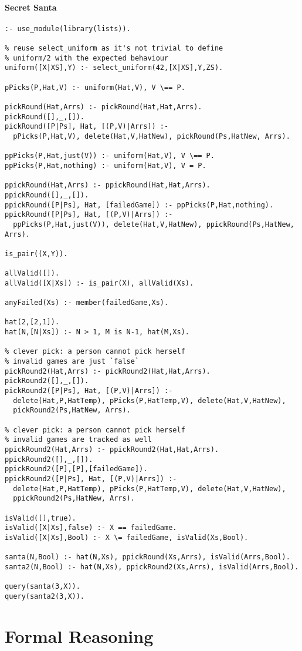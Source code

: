 \paragraph{Secret Santa}
\begin{verbatim}
:- use_module(library(lists)).

% reuse select_uniform as it's not trivial to define
% uniform/2 with the expected behaviour
uniform([X|XS],Y) :- select_uniform(42,[X|XS],Y,ZS).

pPicks(P,Hat,V) :- uniform(Hat,V), V \== P.

pickRound(Hat,Arrs) :- pickRound(Hat,Hat,Arrs).
pickRound([],_,[]).
pickRound([P|Ps], Hat, [(P,V)|Arrs]) :-
  pPicks(P,Hat,V), delete(Hat,V,HatNew), pickRound(Ps,HatNew, Arrs).

ppPicks(P,Hat,just(V)) :- uniform(Hat,V), V \== P.
ppPicks(P,Hat,nothing) :- uniform(Hat,V), V = P.

ppickRound(Hat,Arrs) :- ppickRound(Hat,Hat,Arrs).
ppickRound([],_,[]).
ppickRound([P|Ps], Hat, [failedGame]) :- ppPicks(P,Hat,nothing).
ppickRound([P|Ps], Hat, [(P,V)|Arrs]) :-
  ppPicks(P,Hat,just(V)), delete(Hat,V,HatNew), ppickRound(Ps,HatNew, Arrs).

is_pair((X,Y)).

allValid([]).
allValid([X|Xs]) :- is_pair(X), allValid(Xs).

anyFailed(Xs) :- member(failedGame,Xs).

hat(2,[2,1]).
hat(N,[N|Xs]) :- N > 1, M is N-1, hat(M,Xs).

% clever pick: a person cannot pick herself
% invalid games are just `false`
pickRound2(Hat,Arrs) :- pickRound2(Hat,Hat,Arrs).
pickRound2([],_,[]).
pickRound2([P|Ps], Hat, [(P,V)|Arrs]) :-
  delete(Hat,P,HatTemp), pPicks(P,HatTemp,V), delete(Hat,V,HatNew),
  pickRound2(Ps,HatNew, Arrs).

% clever pick: a person cannot pick herself
% invalid games are tracked as well
ppickRound2(Hat,Arrs) :- ppickRound2(Hat,Hat,Arrs).
ppickRound2([],_,[]).
ppickRound2([P],[P],[failedGame]).
ppickRound2([P|Ps], Hat, [(P,V)|Arrs]) :-
  delete(Hat,P,HatTemp), pPicks(P,HatTemp,V), delete(Hat,V,HatNew),
  ppickRound2(Ps,HatNew, Arrs).

isValid([],true).
isValid([X|Xs],false) :- X == failedGame.
isValid([X|Xs],Bool) :- X \= failedGame, isValid(Xs,Bool).

santa(N,Bool) :- hat(N,Xs), ppickRound(Xs,Arrs), isValid(Arrs,Bool).
santa2(N,Bool) :- hat(N,Xs), ppickRound2(Xs,Arrs), isValid(Arrs,Bool).

query(santa(3,X)).
query(santa2(3,X)).
\end{verbatim}

\section{Formal Reasoning}